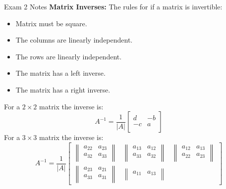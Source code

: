 \begin{examnotes}{Exam 2 Notes}
    \textbf{Matrix Inverses:} The rules for if a matrix is invertible:
    \begin{itemize}
        \item Matrix must be square.
        \item The columns are linearly independent.
        \item The rows are linearly independent.
        \item The matrix has a left inverse.
        \item The matrix has a right inverse.
    \end{itemize}
    For a $2 \times 2$ matrix the inverse is:
    \begin{equation*}
        A^{-1} =
        \frac{1}{|A|}
        \begin{bmatrix}
            d & -b \\
            -c & a \\
        \end{bmatrix}
    \end{equation*}
    For a $3 \times 3$ matrix the inverse is:
    \begin{equation*}
        A^{-1} = 
        \frac{1}{|A|}
        \begin{bmatrix}
            \begin{Vmatrix}
                a_{22} & a_{23} \\
                a_{32} & a_{33} \\
            \end{Vmatrix} &
            \begin{Vmatrix}
                a_{13} & a_{12} \\
                a_{33} & a_{32} \\
            \end{Vmatrix} &
            \begin{Vmatrix}
                a_{12} & a_{13} \\
                a_{22} & a_{23} \\
            \end{Vmatrix} \\
            \begin{Vmatrix}
                a_{23} & a_{21} \\
                a_{33} & a_{31} \\
            \end{Vmatrix} &
            \begin{Vmatrix}
                a_{11} & a_{13} \\

\end{Vmatrix}
\end{bmatrix}
\end{equation*}
\end{examnotes}
